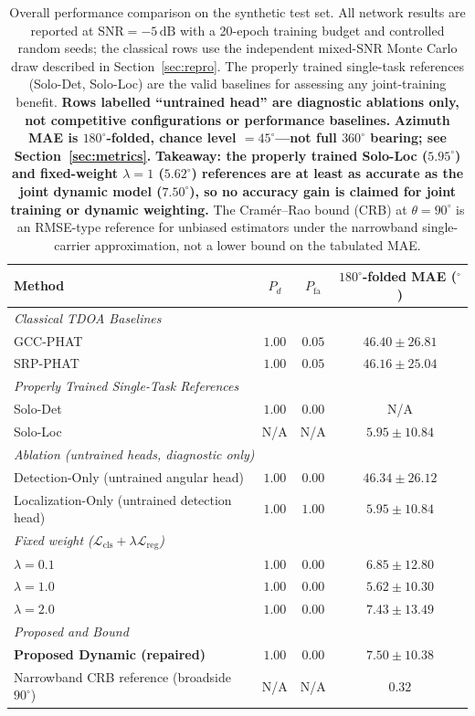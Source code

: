 \documentclass[5p,twocolumn]{elsarticle}
\begin{document}
\begin{table}[t]
\renewcommand{\arraystretch}{1.2}
\caption{Overall performance comparison on the synthetic test set. All network results are reported at $\mathrm{SNR}=-5\,\mathrm{dB}$ with a 20-epoch training budget and controlled random seeds; the classical rows use the independent mixed-SNR Monte Carlo draw described in Section~\ref{sec:repro}. The properly trained single-task references (Solo-Det, Solo-Loc) are the valid baselines for assessing any joint-training benefit. \textbf{Rows labelled ``untrained head'' are diagnostic ablations only, not competitive configurations or performance baselines.} \textbf{Azimuth MAE is $180^\circ$-folded, chance level $=45^\circ$---not full $360^\circ$ bearing; see Section~\ref{sec:metrics}.} \textbf{Takeaway: the properly trained Solo-Loc ($5.95^\circ$) and fixed-weight $\lambda=1$ ($5.62^\circ$) references are at least as accurate as the joint dynamic model ($7.50^\circ$), so no accuracy gain is claimed for joint training or dynamic weighting.} The Cram\'er--Rao bound (CRB) at $\theta=90^\circ$ is an RMSE-type reference for unbiased estimators under the narrowband single-carrier approximation, not a lower bound on the tabulated MAE.}
\label{tab:overall_compare}
\centering
\begin{tabular}{lccc}
\toprule
Method & $P_d$ & $P_{\mathrm{fa}}$ & $180^\circ$-folded MAE ($^\circ$) \\
\midrule
\multicolumn{4}{l}{\textit{Classical TDOA Baselines}} \\
GCC-PHAT~\cite{knapp1976gcc} & $1.00$ & $0.05$ & $46.40\pm26.81$ \\
SRP-PHAT~\cite{dibiase2001srp} & $1.00$ & $0.05$ & $46.16\pm25.04$ \\
\midrule
\multicolumn{4}{l}{\textit{Properly Trained Single-Task References}} \\
Solo-Det & $1.00$ & $0.00$ & N/A \\
Solo-Loc & N/A & N/A & $5.95\pm10.84$ \\
\midrule
\multicolumn{4}{l}{\textit{Ablation (untrained heads, diagnostic only)}} \\
Detection-Only (untrained angular head) & $1.00$ & $0.00$ & $46.34\pm26.12$ \\
Localization-Only (untrained detection head) & $1.00$ & $1.00$ & $5.95\pm10.84$ \\
\midrule
\multicolumn{4}{l}{\textit{Fixed weight ($\mathcal{L}_{\mathrm{cls}}+\lambda\mathcal{L}_{\mathrm{reg}}$)}} \\
$\lambda=0.1$ & $1.00$ & $0.00$ & $6.85\pm12.80$ \\
$\lambda=1.0$ & $1.00$ & $0.00$ & $5.62\pm10.30$ \\
$\lambda=2.0$ & $1.00$ & $0.00$ & $7.43\pm13.49$ \\
\midrule
\multicolumn{4}{l}{\textit{Proposed and Bound}} \\
\textbf{Proposed Dynamic (repaired)} & $\mathbf{1.00}$ & $\mathbf{0.00}$ & $\mathbf{7.50\pm10.38}$ \\
Narrowband CRB reference (broadside $90^\circ$) & N/A & N/A & $0.32$ \\
\bottomrule
\end{tabular}
\end{table}
\end{document}
